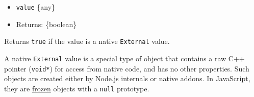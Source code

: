 \begin{itemize}
\tightlist
\item
  \texttt{value} \{any\}
\item
  Returns: \{boolean\}
\end{itemize}

Returns \texttt{true} if the value is a native \texttt{External} value.

A native \texttt{External} value is a special type of object that
contains a raw C++ pointer (\texttt{void*}) for access from native code,
and has no other properties. Such objects are created either by Node.js
internals or native addons. In JavaScript, they are
\href{https://developer.mozilla.org/en-US/docs/Web/JavaScript/Reference/Global_Objects/Object/freeze}{frozen}
objects with a \texttt{null} prototype.

\begin{Shaded}
\begin{Highlighting}[]
\OperatorTok{;}
\OperatorTok{(}\OperatorTok{,}\OperatorTok{)} \OperatorTok{\{}
  \OperatorTok{*}\OperatorTok{=} \OperatorTok{(}\OperatorTok{*)}\OperatorTok{(}\OperatorTok{);}
\OperatorTok{=}\OperatorTok{(}\OperatorTok{,} \OperatorTok{(}\OperatorTok{*)}\OperatorTok{,}\OperatorTok{,}\OperatorTok{,} \OperatorTok{\&}\OperatorTok{);}
   \OperatorTok{(}\OperatorTok{!=}\OperatorTok{)} \OperatorTok{\{}
\OperatorTok{(}\OperatorTok{,}\OperatorTok{,} \OperatorTok{);}
    \OperatorTok{;}
  \OperatorTok{\}}
  \OperatorTok{;}
\OperatorTok{\}}
\OperatorTok{(}\OperatorTok{,}\OperatorTok{)}
\end{Highlighting}
\end{Shaded}

